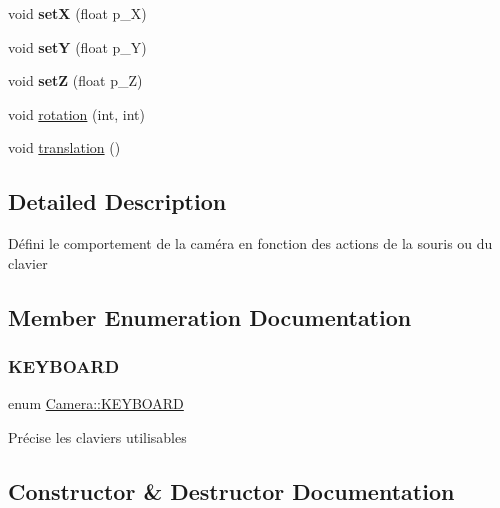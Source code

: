 \begin{DoxyCompactItemize}
void {\bfseries setX} (float p\+\_\+X)
\item 
\hypertarget{class_camera_a0ce1e6403cf1c08acd9b2cb881f35047}{}\label{class_camera_a0ce1e6403cf1c08acd9b2cb881f35047} 
void {\bfseries setY} (float p\+\_\+Y)
\item 
\hypertarget{class_camera_a73ba9f457e516263d08a5f03d78b9360}{}\label{class_camera_a73ba9f457e516263d08a5f03d78b9360} 
void {\bfseries setZ} (float p\+\_\+Z)
\item 
void \hyperlink{class_camera_a8a94e5f6009108908180528439076eb1}{rotation} (int, int)
\item 
void \hyperlink{class_camera_a8b472cc044e4796a28a2abe185e82eb5}{translation} ()
\end{DoxyCompactItemize}


\subsection{Detailed Description}
Défini le comportement de la caméra en fonction des actions de la souris ou du clavier 

\subsection{Member Enumeration Documentation}
\hypertarget{class_camera_a3ba12bb77fc0e6ce7048a7c03c7fa776}{}\label{class_camera_a3ba12bb77fc0e6ce7048a7c03c7fa776} 
\subsubsection{\texorpdfstring{K\+E\+Y\+B\+O\+A\+RD}{KEYBOARD}}
{\footnotesize\ttfamily enum \hyperlink{class_camera_a3ba12bb77fc0e6ce7048a7c03c7fa776}{Camera\+::\+K\+E\+Y\+B\+O\+A\+RD}}

Précise les claviers utilisables 

\subsection{Constructor \& Destructor Documentation}
\hypertarget{class_camera_a09942dcf1bbcf89bbca39601b9f273be}{}\label{class_camera_a09942dcf1bbcf89bbca39601b9f273be} 
